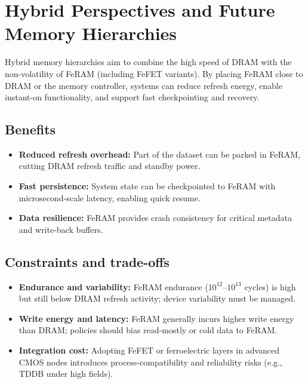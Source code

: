 \section{Hybrid Perspectives and Future Memory Hierarchies}

Hybrid memory hierarchies aim to combine the high speed of DRAM with the non-volatility of FeRAM (including FeFET variants). By placing FeRAM close to DRAM or the memory controller, systems can reduce refresh energy, enable instant-on functionality, and support fast checkpointing and recovery.

\subsection*{Benefits}
\begin{itemize}
  \item \textbf{Reduced refresh overhead:} Part of the dataset can be parked in FeRAM, cutting DRAM refresh traffic and standby power.
  \item \textbf{Fast persistence:} System state can be checkpointed to FeRAM with microsecond-scale latency, enabling quick resume.
  \item \textbf{Data resilience:} FeRAM provides crash consistency for critical metadata and write-back buffers.
\end{itemize}

\subsection*{Constraints and trade-offs}
\begin{itemize}
  \item \textbf{Endurance and variability:} FeRAM endurance ($10^{12}$--$10^{13}$ cycles) is high but still below DRAM refresh activity; device variability must be managed.
  \item \textbf{Write energy and latency:} FeRAM generally incurs higher write energy than DRAM; policies should bias read-mostly or cold data to FeRAM.
  \item \textbf{Integration cost:} Adopting FeFET or ferroelectric layers in advanced CMOS nodes introduces process-compatibility and reliability risks (e.g., TDDB under high fields).
\end{itemize}

